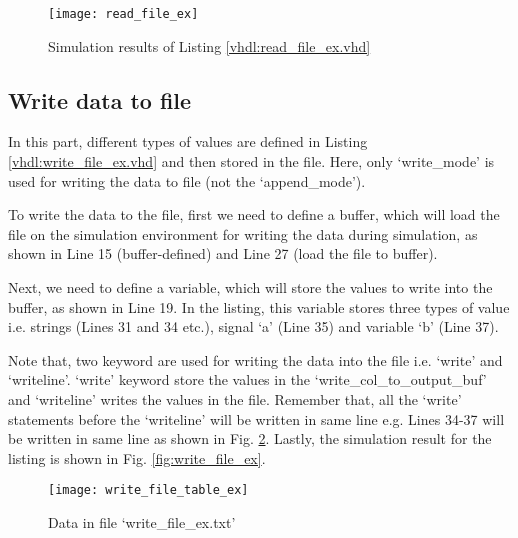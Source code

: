 

\begin{figure}[!h]
	\centering
	\texttt{[image: read\_file\_ex]}
	\caption{Simulation results of Listing \ref{vhdl:read_file_ex.vhd} }
	\label{fig:read_file_ex}
\end{figure}


\subsection{Write data to file}

In this part, different types of values are defined in Listing \ref{vhdl:write_file_ex.vhd} and then stored in the file. Here, only `write\_mode' is used for writing the data to file (not the `append\_mode'). 

\begin{explanation}
	To write the data to the file, first we need to define a buffer, which will load the file on the simulation environment for writing the data during simulation,  as shown in Line 15 (buffer-defined) and Line 27 (load the file to buffer). 
	
	Next, we need to define a variable, which will store the values to write into the buffer, as shown in Line 19. In the listing, this variable stores three types of value i.e. strings (Lines 31 and 34 etc.), signal `a' (Line 35) and variable `b' (Line 37). 
	
	Note that, two keyword are used for writing the data into the file i.e. `write' and `writeline'. `write' keyword store the values in the `write\_col\_to\_output\_buf' and `writeline' writes the values in the file. Remember that, all the `write' statements before the `writeline' will be written in same line e.g. Lines 34-37 will be written in same line as shown in Fig. \ref{fig:write_file_table_ex}. Lastly, the simulation result for the listing is shown in Fig. \ref{fig:write_file_ex}. 
\end{explanation}





\begin{figure}[!h]
	\centering
	\texttt{[image: write\_file\_table\_ex]}
	\caption{Data in file  `write\_file\_ex.txt'}
	\label{fig:write_file_table_ex}
\end{figure}

